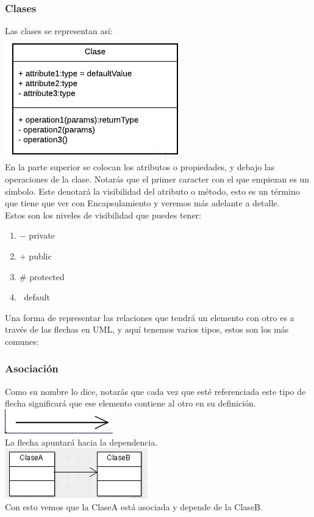 \documentclass[executivepaper]{article}
\begin{document}
\subsubsection{Clases}
Las clases se representan así:\\
\includegraphics[scale=0.5]{2.1.png}\\
En la parte superior se colocan los atributos o propiedades, y debajo las operaciones de la clase. Notarás que el primer caracter con el que empiezan es un símbolo. Este denotará la visibilidad del atributo o método, esto es un término que tiene que ver con Encapsulamiento y veremos más adelante a detalle.\\
Estos son los niveles de visibilidad que puedes tener:
\begin{enumerate}
    \item $-$  private
    \item $+$  public
    \item $\#$  protected
    \item $~$  default
\end{enumerate}

Una forma de representar las relaciones que tendrá un elemento con otro es a través de las flechas en UML, y aquí tenemos varios tipos, estos son los más comunes:
\subsubsection{Asociación}
Como su nombre lo dice, notarás que cada vez que esté referenciada este tipo de flecha significará que ese elemento contiene al otro en su definición.\\
\includegraphics[scale=0.5]{2.2.png}\\
La flecha apuntará hacia la dependencia.\\
\includegraphics[scale=0.5]{2.3.png}\\
Con esto vemos que la ClaseA está asociada y depende de la ClaseB.
\end{document}
